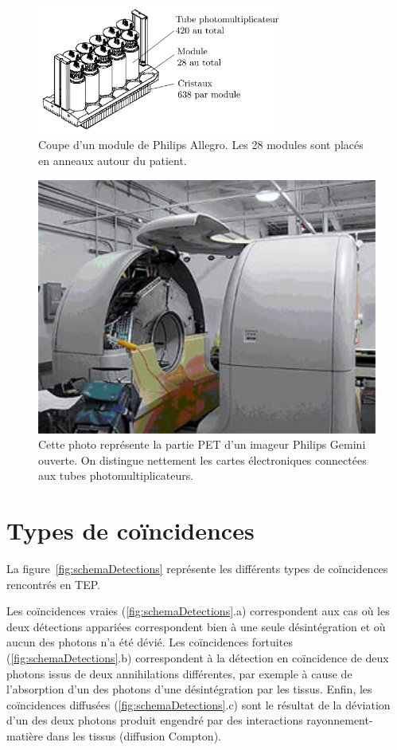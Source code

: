 \begin{figure}
\centering
\includegraphics[width=8cm]{images/coupe_module}
\caption[Coupe d'un module de Philips Allegro]{Coupe d'un module de Philips Allegro. Les 28 modules sont placés en anneaux autour du patient.}
\label{fig:moduleTEP}
\end{figure}


\begin{figure}
\centering
\includegraphics[width=12cm]{images/gemini_eclate}
\caption[Photo d'un imageur philips Gemini ouvert]{Cette photo représente la partie PET d'un imageur Philips Gemini ouverte. On distingue nettement les cartes électroniques connectées aux tubes photomultiplicateurs.}
\label{fig:gemini_ecl}
\end{figure}

	\section{Types de coïncidences}

La figure~\ref{fig:schemaDetections} représente les différents types de coïncidences rencontrés en TEP.

Les coïncidences vraies (\ref{fig:schemaDetections}.a) correspondent aux cas où les deux détections appariées correspondent bien à une seule désintégration et où aucun des photons n'a été dévié. Les coïncidences fortuites (\ref{fig:schemaDetections}.b) correspondent à la détection en coïncidence de deux photons issus de deux annihilations différentes, par exemple à cause de l’absorption d’un des photons d’une désintégration par les tissus. Enfin, les coïncidences diffusées (\ref{fig:schemaDetections}.c) sont le résultat de la déviation d'un des deux photons produit engendré par des interactions rayonnement-matière dans les tissus (diffusion Compton). 

